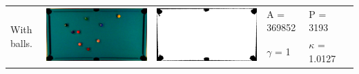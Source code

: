 \begin{tabular}{|l|c|c|l|l|c|}
\multirow{2}{*}{With balls.} & \multirow{2}{*}{\includegraphics[scale=0.05]{../images/1/1_img.png}} & \multirow{2}{*}{\includegraphics[scale=0.05]{../images/1/1_mask.png}} & A = 369852 & P = 3193 & \multirow{2}{*}{}\\ 
& & & $\gamma$ = 1 & $\kappa$ = 1.0127 & \\
\hline


\end{tabular}
